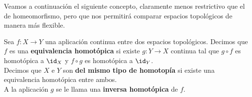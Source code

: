 Veamos a continuación el siguiente concepto, claramente menos restrictivo que el de homeomorfismo, pero que nos permitirá comparar espacios topológicos de manera más flexible.
\begin{definicion}%
    Sea $f:X\to Y$ una aplicación continua entre dos espacios topológicos. Decimos que $f$ es una \textbf{equivalencia homotópica} si existe $g:Y\to X$ continua tal que $g\circ f$ es homotópica a $\id_X$ y $f\circ g$ es homotópica a $\id_Y$.\\

    Decimos que $X$ e $Y$ son \textbf{del mismo tipo de homotopía} si existe una equivalencia homotópica entre ambos.\\

    A la aplicación $g$ se le llama una \textbf{inversa homotópica} de $f$.
\end{definicion}

